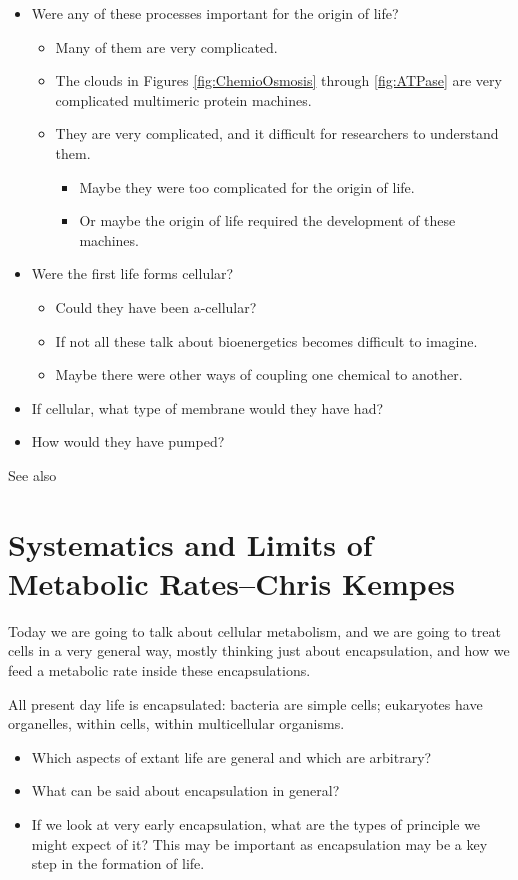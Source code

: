 \documentclass[]{article}
\begin{document}
\begin{itemize}
	\item Were any of these processes important for the origin of life?
	\begin{itemize}
		\item Many of them are very complicated.
		\item The clouds in Figures \ref{fig:ChemioOsmosis} through \ref{fig:ATPase} are very complicated multimeric protein machines.
		\item They are very complicated, and it difficult for researchers to understand them. \begin{itemize}
			\item Maybe they were too complicated for the origin of life.
			\item Or maybe the origin of life required the development of these machines.
		\end{itemize}
	\end{itemize}
	\item Were the first life forms cellular?
	\begin{itemize}
		\item Could they have been a-cellular?
		\item If not all these talk about bioenergetics becomes difficult to imagine.
		\item Maybe there were other ways of coupling one chemical to another.
	\end{itemize}
	\item If cellular, what type of membrane would they have had?
	\item How would they have pumped?
\end{itemize}

See also \cite{alberts2013essential,simon2008organisation,weizmann2020eQuilibrator}

\section[Systematics and Limits of Metabolic Rates]{Systematics and Limits of Metabolic Rates--Chris Kempes}

Today we are going to talk about cellular metabolism, and we are going to treat cells in a very general way, mostly thinking just about encapsulation, and how we feed a metabolic rate inside these encapsulations.

All present day life is encapsulated: bacteria are simple cells; eukaryotes have organelles, within cells, within multicellular organisms.
\begin{itemize}
	\item Which aspects of extant life are general and 	which are arbitrary?
	\item What can be said about encapsulation in general?
	\item If we look at very early encapsulation, what are the types of principle we might expect of it? This may be important as encapsulation may be a key step in the formation of life.
\end{itemize}
\end{document}
